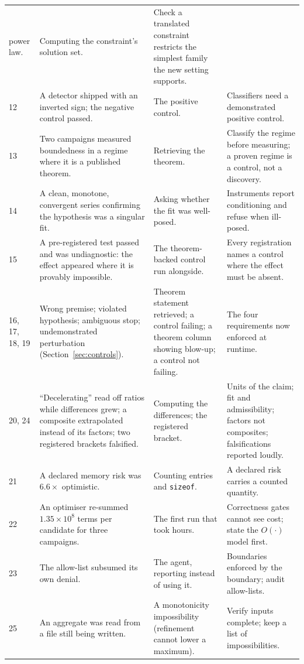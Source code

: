 \documentclass[11pt]{article}
\begin{document}
\begin{center}
\begin{longtable}{@{}p{0.9cm}p{5.4cm}p{3.6cm}p{5.1cm}@{}}
power law. & Computing the constraint's solution set. & Check a translated constraint restricts
the simplest family the new setting supports. \\
12 & A detector shipped with an inverted sign; the negative control passed. & The positive
control. & Classifiers need a demonstrated positive control. \\
13 & Two campaigns measured boundedness in a regime where it is a published theorem. &
Retrieving the theorem. & Classify the regime before measuring; a proven regime is a control,
not a discovery. \\
14 & A clean, monotone, convergent series confirming the hypothesis was a singular fit. &
Asking whether the fit was well-posed. & Instruments report conditioning and refuse when
ill-posed. \\
15 & A pre-registered test passed and was undiagnostic: the effect appeared where it is
provably impossible. & The theorem-backed control run alongside. & Every registration names a
control where the effect must be absent. \\
16, 17, 18, 19 & Wrong premise; violated hypothesis; ambiguous stop; undemonstrated
perturbation (Section~\ref{sec:controls}). & Theorem statement retrieved; a control failing; a
theorem column showing blow-up; a control not failing. & The four requirements now enforced
at runtime. \\
20, 24 & ``Decelerating'' read off ratios while differences grew; a composite extrapolated
instead of its factors; two registered brackets falsified. & Computing the differences; the
registered bracket. & Units of the claim; fit and admissibility; factors not composites;
falsifications reported loudly. \\
21 & A declared memory risk was $6.6\times$ optimistic. & Counting entries and \texttt{sizeof}. &
A declared risk carries a counted quantity. \\
22 & An optimiser re-summed $1.35\times10^{8}$ terms per candidate for three campaigns. & The
first run that took hours. & Correctness gates cannot see cost; state the $O(\cdot)$ model
first. \\
23 & The allow-list subsumed its own denial. & The agent, reporting instead of using it. &
Boundaries enforced by the boundary; audit allow-lists. \\
25 & An aggregate was read from a file still being written. & A monotonicity impossibility
(refinement cannot lower a maximum). & Verify inputs complete; keep a list of impossibilities. \\

\end{longtable}
\end{center}
\end{document}
